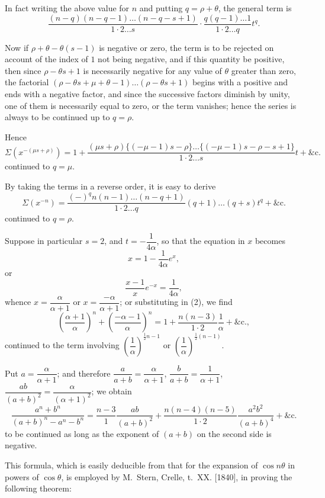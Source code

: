 \documentclass[11pt,a4paper]{book}
\begin{document}
In fact writing the above value for $n$ and putting $q = \rho + \theta$, the general term is
\[
\frac{(n - q)(n - q - 1)\ldots(n - q - s + 1)}{1 \cdot 2 \ldots s} \cdot \frac{q(q - 1)\ldots 1}{1 \cdot 2 \ldots q}t^q.
\]

Now if $\rho + \theta - \theta(s - 1)$ is negative or zero, the term is to be rejected on account of the index of $1$ not being negative, and if this quantity be positive, then since $\rho - \theta s + 1$ is necessarily negative for any value of $\theta$ greater than zero, the factorial $(\rho - \theta s + \mu + \theta - 1)\ldots(\rho - \theta s + 1)$ begins with a positive and ends with a negative factor, and since the successive factors diminish by unity, one of them is necessarily equal to zero, or the term vanishes; hence the series is always to be continued up to $q = \rho$.

Hence
\[
\Sigma(x^{-(\mu s + \rho)}) = 1 + \frac{(\mu s + \rho)\{(-\mu - 1)s - \rho\}\ldots\{(-\mu - 1)s - \rho - s + 1\}}{1 \cdot 2 \ldots s}t + \&\text{c.} \tag{3}
\]
continued to $q = \mu$.

By taking the terms in a reverse order, it is easy to derive
\[
\Sigma(x^{-n}) = \frac{(-)^q n(n - 1)\ldots(n - q + 1)}{1 \cdot 2 \ldots q}(q + 1)\ldots(q + s)t^q + \&\text{c.} \tag{4}
\]
continued to $q = \rho$.

Suppose in particular $s = 2$, and $t = -\dfrac{1}{4\alpha}$, so that the equation in $x$ becomes
\[
x = 1 - \frac{1}{4\alpha}e^x,
\]
or
\[
\frac{x - 1}{x}e^{-x} = \frac{1}{4\alpha},
\]
whence $x = \dfrac{\alpha}{\alpha + 1}$ or $x = \dfrac{-\alpha}{\alpha + 1}$; or substituting in (2), we find
\[
\left(\frac{\alpha + 1}{\alpha}\right)^n + \left(\frac{-\alpha - 1}{\alpha}\right)^n = 1 + \frac{n(n - 3)}{1 \cdot 2}\frac{1}{\alpha} + \&\text{c.},
\]
continued to the term involving $\left(\dfrac{1}{\alpha}\right)^{\frac{1}{2}n - 1}$ or $\left(\dfrac{1}{\alpha}\right)^{\frac{1}{2}(n - 1)}$.

Put $a = \dfrac{\alpha}{\alpha + 1}$; and therefore $\dfrac{a}{a + b} = \dfrac{\alpha}{\alpha + 1}$, $\dfrac{b}{a + b} = \dfrac{1}{\alpha + 1}$, $\dfrac{ab}{(a + b)^2} = \dfrac{\alpha}{(\alpha + 1)^2}$; we obtain
\[
\frac{a^n + b^n}{(a + b)^n - a^n - b^n} = \frac{n - 3}{1}\frac{ab}{(a + b)^2} + \frac{n(n - 4)(n - 5)}{1 \cdot 2}\frac{a^2b^2}{(a + b)^4} + \&\text{c.} \tag{7}
\]
to be continued as long as the exponent of $(a + b)$ on the second side is negative.

\newpage
[187]

This formula, which is easily deducible from that for the expansion of $\cos n\theta$ in powers of $\cos\theta$, is employed by M.\ Stern, Crelle, t.~XX. [1840], in proving the following theorem:
\end{document}
